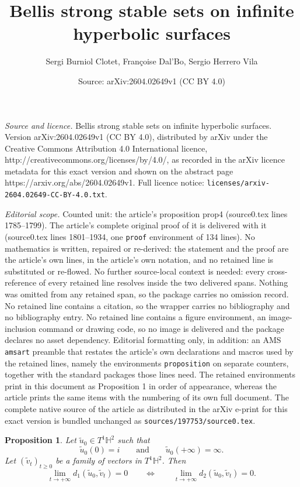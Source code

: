 \documentclass[10pt,a4paper]{amsart}
\title{Bellis strong stable sets on infinite hyperbolic surfaces}
\author{Sergi Burniol Clotet, Fran\c{c}oise Dal'Bo, Sergio Herrero Vila}
\date{Source: arXiv:2604.02649v1 (CC BY 4.0)}
\newtheorem{proposition}{Proposition}
\begin{document}
\maketitle

\noindent\emph{Source and licence.} Bellis strong stable sets on infinite hyperbolic surfaces. Version arXiv:2604.02649v1 (CC BY 4.0), distributed by arXiv under the Creative Commons Attribution 4.0 International licence, http://creativecommons.org/licenses/by/4.0/, as recorded in the arXiv licence metadata for this exact version and shown on the abstract page https://arxiv.org/abs/2604.02649v1. Full licence notice: \texttt{licenses/arxiv-2604.02649-CC-BY-4.0.txt}.\par\smallskip

\noindent\textit{Editorial scope.} Counted unit: the article's proposition prop4 (source0.tex lines 1785--1799). The article's complete original proof of it is delivered with it (source0.tex lines 1801--1934, one \texttt{proof} environment of 134 lines). No mathematics is written, repaired or re-derived: the statement and the proof are the article's own lines, in the article's own notation, and no retained line is substituted or re-flowed.  No further source-local context is needed: every cross-reference of every retained line resolves inside the two delivered spans.  Nothing was omitted from any retained span, so the package carries no omission record.  No retained line contains a citation, so the wrapper carries no bibliography and no bibliography entry.  No retained line contains a figure environment, an image-inclusion command or drawing code, so no image is delivered and the package declares no asset dependency.  Editorial formatting only, in addition: an AMS \texttt{amsart} preamble that restates the article's own declarations and macros used by the retained lines, namely the environments \texttt{proposition} on separate counters, together with the standard packages those lines need.  The retained environments print in this document as Proposition 1 in order of appearance, whereas the article prints the same items with the numbering of its own full document.  The complete native source of the article as distributed in the arXiv e-print for this exact version is bundled unchanged as \texttt{sources/197753/source0.tex}.
\begin{proposition}\label{prop4}
	Let $\tilde u_{0}\in T^{1}\mathbb H^{2}$ such that
	\[
	\tilde u_{0}(0)=i
	\qquad\text{and}\qquad
	\tilde u_{0}(+\infty)=\infty.
	\]
	Let $(\tilde v_{t})_{t\geq 0}$ be a family of vectors in $T^{1}\mathbb H^{2}$.
	Then
	\[
	\lim\limits_{t\to+\infty} d_{1}(\tilde u_{0},\tilde v_{t})=0
	\qquad\Longleftrightarrow\qquad
	\lim\limits_{t\to+\infty} d_{2}(\tilde u_{0},\tilde v_{t})=0.
	\]
\end{proposition}
\end{document}
